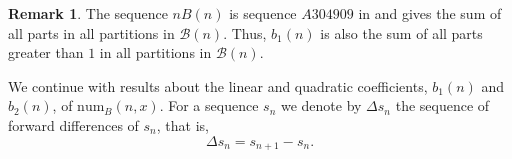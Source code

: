 \documentclass[reqno]{amsart}
\def\num{\mathrm{num}}
\theoremstyle{definition}
\newtheorem{remark}{Remark}
\begin{document}
 \begin{remark} The sequence $nB(n)$ is sequence $A304909$ in \cite{OEIS}  and gives  the sum of all parts in all partitions in $\mathcal B(n)$. Thus, $b_1(n)$ is also the sum of all parts greater than $1$ in all partitions in $\mathcal B(n)$.
     \end{remark}






We continue with results about the linear and quadratic coefficients, $b_1(n)$ and $b_2(n)$, of $\num_B(n,x)$. For a sequence $s_n$ we denote by $\Delta s_n$ the sequence of forward differences of $s_n$, that is, $$\Delta s_n=s_{n+1}-s_n.$$
\end{document}
